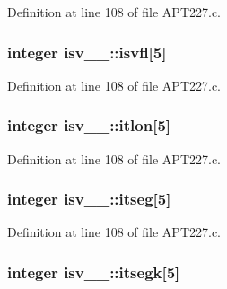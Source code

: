 Definition at line 108 of file A\+P\+T227.\+c.

\subsubsection[{\texorpdfstring{isvfl}{isvfl}}]{\setlength{\rightskip}{0pt plus 5cm}integer isv\+\_\+\_\+\+::isvfl\mbox{[}5\mbox{]}}\hypertarget{structisv__1___a68ef3c478c099d73e4744b55c58bb0cc}{}\label{structisv__1___a68ef3c478c099d73e4744b55c58bb0cc}


Definition at line 108 of file A\+P\+T227.\+c.

\subsubsection[{\texorpdfstring{itlon}{itlon}}]{\setlength{\rightskip}{0pt plus 5cm}integer isv\+\_\+\_\+\+::itlon\mbox{[}5\mbox{]}}\hypertarget{structisv__1___ad62c553111ab8723705b6c605bf0fca8}{}\label{structisv__1___ad62c553111ab8723705b6c605bf0fca8}


Definition at line 108 of file A\+P\+T227.\+c.

\subsubsection[{\texorpdfstring{itseg}{itseg}}]{\setlength{\rightskip}{0pt plus 5cm}integer isv\+\_\+\_\+\+::itseg\mbox{[}5\mbox{]}}\hypertarget{structisv__1___a1dd2294ae60dea9bc37e7c6a0f05970a}{}\label{structisv__1___a1dd2294ae60dea9bc37e7c6a0f05970a}


Definition at line 108 of file A\+P\+T227.\+c.

\subsubsection[{\texorpdfstring{itsegk}{itsegk}}]{\setlength{\rightskip}{0pt plus 5cm}integer isv\+\_\+\_\+\+::itsegk\mbox{[}5\mbox{]}}\hypertarget{structisv__1___a0e65196a19942a2f5b9b70aa3361f2ba}{}\label{structisv__1___a0e65196a19942a2f5b9b70aa3361f2ba}


